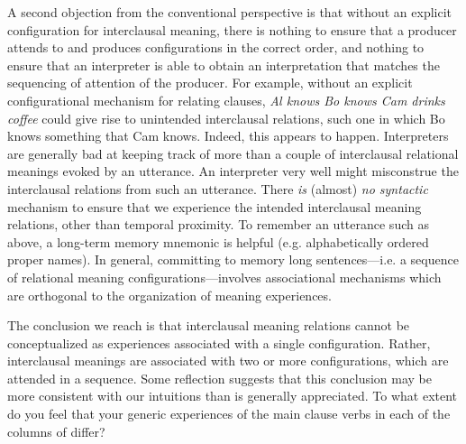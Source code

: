   A second objection from the conventional perspective is that without an explicit configuration for interclausal meaning, there is nothing to ensure that a producer attends to and produces configurations in the correct order, and nothing to ensure that an interpreter is able to obtain an interpretation that matches the sequencing of attention of the producer. For example, without an explicit configurational mechanism for relating clauses, \textit{Al knows Bo knows Cam drinks coffee} could give rise to unintended interclausal relations, such one in which Bo knows something that Cam knows. Indeed, this appears to happen. Interpreters are generally bad at keeping track of more than a couple of interclausal relational meanings evoked by an utterance. An interpreter very well might misconstrue the interclausal relations from such an utterance. There \textit{is} (almost) \textit{no syntactic} mechanism to ensure that we experience the intended interclausal meaning relations, other than temporal proximity. To remember an utterance such as above, a long-term memory mnemonic is helpful (e.g. alphabetically ordered proper names). In general, committing to memory long sentences—i.e. a sequence of relational meaning configurations—involves associational mechanisms which are orthogonal to the organization of meaning experiences.

  The conclusion we reach is that interclausal meaning relations cannot be conceptualized as experiences associated with a single configuration. Rather, interclausal meanings are associated with two or more configurations, which are attended in a sequence. Some reflection suggests that this conclusion may be more consistent with our intuitions than is generally appreciated. To what extent do you feel that your generic experiences of the main clause verbs in each of the columns of {} differ?

